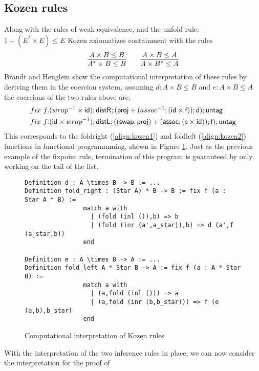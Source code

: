 \documentclass[a4paper,UKenglish,cleveref, autoref, thm-restate]{lipics-v2021}
\begin{document}
\subsection{Kozen rules}
Along with the rules of weak equivalence, and the unfold rule: $1 + (E^* \times E) \leq E$ Kozen axiomatizes containment with the rules
\begin{displaymath}
\infer{A^* \times B \leq B}{A \times B \leq B} \qquad \infer{A \times B^* \leq A}{A \times B \leq A}
\end{displaymath}
Brandt and Henglein show the  computational interpretation of these rules by deriving them in the coercion system, assuming $d : A \times B \leq B $ and $e : A \times B \leq A $ the coercions of the two rules above are:
\begin{align}
&\fix~f.(\dslcominv{wrap}\times \dslcom{id}); \dslcom{distR};(\dslcom{proj} + (\dslcominv{assoc};(\dslcom{id} \times \dslcom{f}));\dslcom{d});\dslcom{untag}\label{align:kozen1}\\
&\fix~f.( \dslcom{id} \times \dslcominv{wrap}); \dslcom{distL};((\dslcom{swap};\dslcom{proj}) + (\dslcom{assoc};(\dslcom{e} \times \dslcom{id}));\dslcom{f});\dslcom{untag}\label{align:kozen2}
\end{align}
This corresponds to the  \textsf{foldright} (\ref{align:kozen1}) and \textsf{foldleft} (\ref{align:kozen2}) functions in functional programmming, shown in Figure \ref{figure:kozen}. Just as the previous example of the fixpoint rule, termination of this program is guaranteed by only working on the tail of the list.
\begin{figure}\label{figure:kozen}
\caption{Computational interpretation of Kozen rules}
  \centering
  \begin{verbatim}
Definition d : A \times B -> B := ...
Definition fold_right : (Star A) * B -> B := fix f (a : Star A * B) := 
                match a with 
                  | (fold (inl ()),b) => b 
                  | (fold (inr (a',a_star)),b) => d (a',f (a_star,b))
                end

Definition e : A \times B -> A := ...
Definition fold_left A * Star B -> A := fix f (a : A * Star B) := 
                match a with 
                  | (a,fold (inl ())) => a
                  | (a,fold (inr (b,b_star))) => f (e (a,b),b_star)
                end
\end{verbatim}
\end{figure}
With the interpretation of the two inference rules in place, we can now consider the interpretation for the proof of
\end{document}
